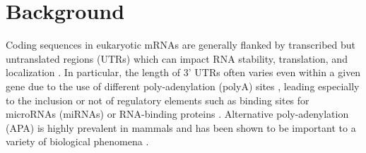 \documentclass{bmcart}
\begin{document}


\section*{Background}

Coding sequences in eukaryotic mRNAs are generally flanked by transcribed but untranslated regions (UTRs) which can impact RNA stability, translation, and localization \cite{Lewis1995TheMetabolism}. In particular, the length of 3' UTRs often varies even within a given gene due to the use of different poly-adenylation (polyA) sites \cite{Tian2016AlternativePrecursors}, leading especially to the inclusion or not of regulatory elements such as binding sites for microRNAs (miRNAs) or RNA-binding proteins \cite{Fabian2010RegulationMicroRNAs}. Alternative poly-adenylation (APA) is highly prevalent in mammals \cite{Derti2012AMammalsimportance} and has been shown to be important to a variety of biological phenomena \cite{Sandberg2008ProliferatingSites,Mayr2009WidespreadCells,Miura2013WidespreadBrain, Ha2018QAPA:Data}.
\end{document}
